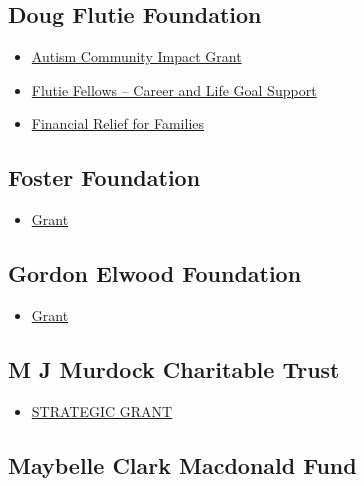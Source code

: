 \documentclass[
  letterpaper,
  DIV=11,
  numbers=noendperiod]{scrreprt}
\providecommand{\tightlist}{%
  \setlength{\itemsep}{0pt}\setlength{\parskip}{0pt}}\usepackage{longtable,booktabs,array}
\begin{document}
\subsection{Doug Flutie Foundation}\label{doug-flutie-foundation}

\begin{itemize}
\tightlist
\item
  \href{https://flutiefoundation.org/helping-communities/autism-community-impact-grant/}{Autism
  Community Impact Grant}
\item
  \href{https://flutiefoundation.org/helping-individuals/flutie-fellows-career-and-life-goal-support/}{Flutie
  Fellows -- Career and Life Goal Support}
\item
  \href{https://flutiefoundation.org/helping-families/direct-financial-support/}{Financial
  Relief for Families}
\end{itemize}

\subsection{Foster Foundation}\label{foster-foundation}

\begin{itemize}
\tightlist
\item
  \href{http://www.thefosterfoundation.org/Home.htm}{Grant}
\end{itemize}

\subsection{Gordon Elwood Foundation}\label{gordon-elwood-foundation}

\begin{itemize}
\tightlist
\item
  \href{https://www.gordonelwoodfoundation.org/index}{Grant}
\end{itemize}

\subsection{M J Murdock Charitable
Trust}\label{m-j-murdock-charitable-trust}

\begin{itemize}
\tightlist
\item
  \href{https://murdocktrust.org/grant-application-process/}{STRATEGIC
  GRANT}
\end{itemize}

\subsection{Maybelle Clark Macdonald
Fund}\label{maybelle-clark-macdonald-fund}
\end{document}
